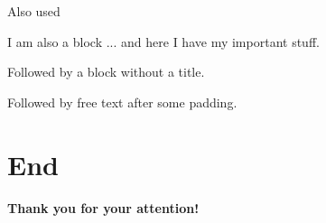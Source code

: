 \documentclass{beamer}
\theoremstyle{plain}
\theoremstyle{definition}
\theoremstyle{definition}
\begin{document}
\begin{frame}{Also used}	
\begin{small}

\begin{block}{I am also a block}
	... and here I have my important stuff.
\end{block}

\begin{block}{}
	Followed by a block without a title.
\end{block}

\vspace{1cm}
Followed by free text after some padding.

\end{small}
\end{frame}


\section{End}

\begin{frame}{\text{ }}


\begin{center}
\begin{LARGE}
\textbf{Thank you for your attention!}
\end{LARGE}
\end{center}

\end{frame}
\end{document}
